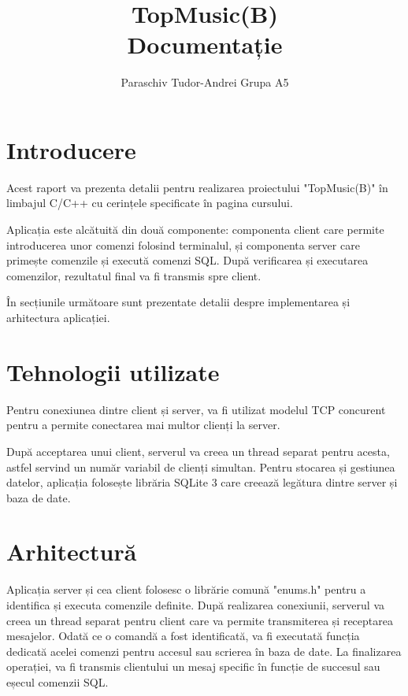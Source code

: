 \documentclass{article}
\begin{document}
\author{Paraschiv Tudor-Andrei Grupa A5}
\title{TopMusic(B)\\Documentație}
\maketitle
\newpage

\section{Introducere}
\hspace{4mm}Acest raport va prezenta detalii pentru realizarea proiectului "TopMusic(B)" în limbajul C/C++ cu cerințele specificate în pagina cursului.

	Aplicația este alcătuită din două componente: componenta client care permite introducerea unor comenzi folosind terminalul, și componenta server care primește comenzile și execută comenzi SQL. După verificarea și executarea comenzilor, rezultatul final va fi transmis spre client.

	În secțiunile următoare sunt prezentate detalii despre implementarea și arhitectura aplicației.
\section{Tehnologii utilizate}
\hspace{4mm}Pentru conexiunea dintre client și server, va fi utilizat modelul TCP concurent pentru a permite conectarea mai multor clienți la server. 

După acceptarea unui client, serverul va creea un thread separat pentru acesta, astfel servind un număr variabil de clienți simultan. Pentru stocarea și gestiunea datelor, aplicația folosește librăria SQLite 3 care creează legătura dintre server și baza de date.


\section{Arhitectură}
\hspace{4mm}Aplicația server și cea client folosesc o librărie comună "enums.h" pentru a identifica și executa comenzile definite. După realizarea conexiunii, serverul va creea un thread separat pentru client care va permite transmiterea și receptarea mesajelor. Odată ce o comandă a fost identificată, va fi executată funcția dedicată acelei comenzi pentru accesul sau scrierea în baza de date. La finalizarea operației, va fi transmis clientului un mesaj specific în funcție de succesul sau eșecul comenzii SQL.
	
\end{document}
